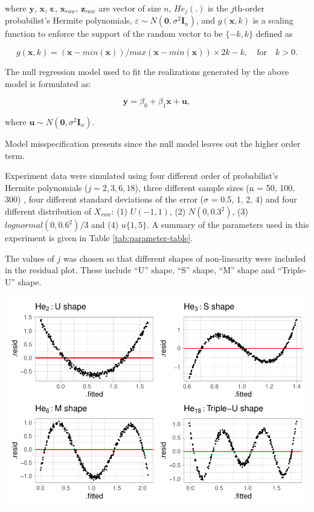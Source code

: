 \documentclass[]{interact}
\theoremstyle{plain}%
\theoremstyle{definition}
\theoremstyle{remark}
\begin{document}
where \(\boldsymbol{y}\), \(\boldsymbol{x}\),
\(\boldsymbol{\varepsilon}\), \(\boldsymbol{x}_{raw}\),
\(\boldsymbol{z}_{raw}\) are vector of size \(n\), \(He_{j}(.)\) is the
\(j\)th-order probabilist's Hermite polynomials,
\(\varepsilon \sim N(\boldsymbol{0}, \sigma^2\boldsymbol{I}_n)\), and
\(g(\boldsymbol{x}, k)\) is a scaling function to enforce the support of
the random vector to be \(\{-k, k\}\) defined as

\begin{equation} \label{eq:scaling-function}
g(\boldsymbol{x}, k) = (\boldsymbol{x} - min(\boldsymbol{x}))/max(\boldsymbol{x} - min(\boldsymbol{x})) \times 2k - k, \quad \text{for} \quad k > 0. 
\end{equation}

The null regression model used to fit the realizations generated by the
above model is formulated as:

\begin{equation} \label{eq:scaling-function}
\boldsymbol{y} = \beta_0 + \beta_1 \boldsymbol{x} + \boldsymbol{u},
\end{equation}

where
\(\boldsymbol{u} \sim N(\boldsymbol{0}, \sigma^2\boldsymbol{I}_n)\).

Model misspecification presents since the null model leaves out the
higher order term.

Experiment data were simulated using four different order of
probabilist's Hermite polynomials (\(j = 2, 3, 6, 18\)), three different
sample sizes (n = 50, 100, 300) , four different standard deviations of
the error (\(\sigma\) = 0.5, 1, 2, 4) and four different distribution of
\(X_{raw}\): (1) \(U(-1, 1)\), (2) \(N(0, 0.3^2)\), (3)
\(lognormal(0, 0.6^2)/3\) and (4) \(u\{1, 5\}\). A summary of the
parameters used in this experiment is given in Table
\ref{tab:parameter-table}.

The values of \(j\) was chosen so that different shapes of non-linearity
were included in the residual plot. These include ``U'' shape, ``S''
shape, ``M'' shape and ``Triple-U'' shape.

\includegraphics{paper_comparison_files/figure-latex/different-shape-of-herimite-1.pdf}
\end{document}
